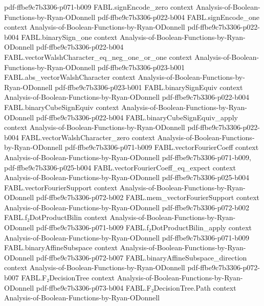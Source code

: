 \begin{theorem}
{    pdf-ffbe9c7b3306-p071-b009}
\proofstep
  {FABL.signEncode_zero}
  {context}
  {Analysis-of-Boolean-Functions-by-Ryan-ODonnell}
  {pdf-ffbe9c7b3306-p022-b004}
\proofstep
  {FABL.signEncode_one}
  {context}
  {Analysis-of-Boolean-Functions-by-Ryan-ODonnell}
  {pdf-ffbe9c7b3306-p022-b004}
\proofstep
  {FABL.binarySign_one}
  {context}
  {Analysis-of-Boolean-Functions-by-Ryan-ODonnell}
  {pdf-ffbe9c7b3306-p022-b004}
\proofstep
  {FABL.vectorWalshCharacter_eq_neg_one_or_one}
  {context}
  {Analysis-of-Boolean-Functions-by-Ryan-ODonnell}
  {pdf-ffbe9c7b3306-p023-b001}
\proofstep
  {FABL.abs_vectorWalshCharacter}
  {context}
  {Analysis-of-Boolean-Functions-by-Ryan-ODonnell}
  {pdf-ffbe9c7b3306-p023-b001}
\proofstep
  {FABL.binarySignEquiv}
  {context}
  {Analysis-of-Boolean-Functions-by-Ryan-ODonnell}
  {pdf-ffbe9c7b3306-p022-b004}
\proofstep
  {FABL.binaryCubeSignEquiv}
  {context}
  {Analysis-of-Boolean-Functions-by-Ryan-ODonnell}
  {pdf-ffbe9c7b3306-p022-b004}
\proofstep
  {FABL.binaryCubeSignEquiv_apply}
  {context}
  {Analysis-of-Boolean-Functions-by-Ryan-ODonnell}
  {pdf-ffbe9c7b3306-p022-b004}
\proofstep
  {FABL.vectorWalshCharacter_zero}
  {context}
  {Analysis-of-Boolean-Functions-by-Ryan-ODonnell}
  {pdf-ffbe9c7b3306-p071-b009}
\proofstep
  {FABL.vectorFourierCoeff}
  {context}
  {Analysis-of-Boolean-Functions-by-Ryan-ODonnell}
  {pdf-ffbe9c7b3306-p071-b009,
    pdf-ffbe9c7b3306-p025-b004}
\proofstep
  {FABL.vectorFourierCoeff_eq_expect}
  {context}
  {Analysis-of-Boolean-Functions-by-Ryan-ODonnell}
  {pdf-ffbe9c7b3306-p025-b004}
\proofstep
  {FABL.vectorFourierSupport}
  {context}
  {Analysis-of-Boolean-Functions-by-Ryan-ODonnell}
  {pdf-ffbe9c7b3306-p072-b002}
\proofstep
  {FABL.mem_vectorFourierSupport}
  {context}
  {Analysis-of-Boolean-Functions-by-Ryan-ODonnell}
  {pdf-ffbe9c7b3306-p072-b002}
\proofstep
  {FABL.f₂DotProductBilin}
  {context}
  {Analysis-of-Boolean-Functions-by-Ryan-ODonnell}
  {pdf-ffbe9c7b3306-p071-b009}
\proofstep
  {FABL.f₂DotProductBilin_apply}
  {context}
  {Analysis-of-Boolean-Functions-by-Ryan-ODonnell}
  {pdf-ffbe9c7b3306-p071-b009}
\proofstep
  {FABL.binaryAffineSubspace}
  {context}
  {Analysis-of-Boolean-Functions-by-Ryan-ODonnell}
  {pdf-ffbe9c7b3306-p072-b007}
\proofstep
  {FABL.binaryAffineSubspace_direction}
  {context}
  {Analysis-of-Boolean-Functions-by-Ryan-ODonnell}
  {pdf-ffbe9c7b3306-p072-b007}
\proofstep
  {FABL.F₂DecisionTree}
  {context}
  {Analysis-of-Boolean-Functions-by-Ryan-ODonnell}
  {pdf-ffbe9c7b3306-p073-b004}
\proofstep
  {FABL.F₂DecisionTree.Path}
  {context}
  {Analysis-of-Boolean-Functions-by-Ryan-ODonnell}

\end{theorem}
